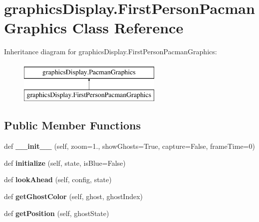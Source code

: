 \hypertarget{classgraphics_display_1_1_first_person_pacman_graphics}{}\section{graphics\+Display.\+First\+Person\+Pacman\+Graphics Class Reference}
\label{classgraphics_display_1_1_first_person_pacman_graphics}
Inheritance diagram for graphics\+Display.\+First\+Person\+Pacman\+Graphics\+:\begin{figure}[H]
\begin{center}
\leavevmode
\includegraphics[height=2.000000cm]{classgraphics_display_1_1_first_person_pacman_graphics}
\end{center}
\end{figure}
\subsection*{Public Member Functions}
\begin{DoxyCompactItemize}
\item 
\mbox{\label{classgraphics_display_1_1_first_person_pacman_graphics_a9a4254cdca8646924056b36442d89ee4}} 
def {\bfseries \+\_\+\+\_\+init\+\_\+\+\_\+} (self, zoom=1., show\+Ghosts=True, capture=False, frame\+Time=0)
\item 
\mbox{\label{classgraphics_display_1_1_first_person_pacman_graphics_a43779a7ad6e7ee48c7169b4b5312ccd1}} 
def {\bfseries initialize} (self, state, is\+Blue=False)
\item 
\mbox{\label{classgraphics_display_1_1_first_person_pacman_graphics_a6996651f68d57f2e405dbcc57e8d29ac}} 
def {\bfseries look\+Ahead} (self, config, state)
\item 
\mbox{\label{classgraphics_display_1_1_first_person_pacman_graphics_a7c603b3281c4d2d0ac672e6344e29798}} 
def {\bfseries get\+Ghost\+Color} (self, ghost, ghost\+Index)
\item 
\mbox{\label{classgraphics_display_1_1_first_person_pacman_graphics_aa5628ea291a7f5b2650f27cd147711e5}} 
def {\bfseries get\+Position} (self, ghost\+State)
\end{DoxyCompactItemize}
